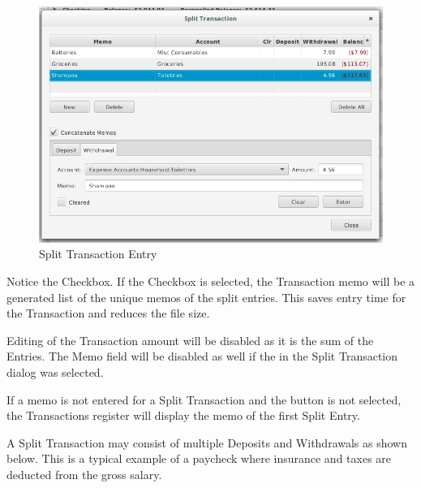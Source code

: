 \documentclass[letterpaper,12pt]{book}
\begin{document}
    \begin{figure}[h]
        \caption{Split Transaction Entry}
        \includegraphics[width=1.0\linewidth]{images/splitTransactionEntry}
    \end{figure}

    Notice the  Checkbox. If the Checkbox is selected, the Transaction memo will be a generated list
    of the unique memos of the split entries. This saves entry time for the Transaction and reduces the file size.

    Editing of the Transaction amount will be disabled as it is the sum of the Entries. The Memo field will be disabled
    as well if the  in the Split Transaction dialog was selected.

    If a memo is not entered for a Split Transaction and the  button is not selected, the
    Transactions register will display the memo of the first Split Entry.

    A Split Transaction may consist of multiple Deposits and Withdrawals as shown below. This is a typical example
    of a paycheck where insurance and taxes are deducted from the gross salary.

\end{document}
